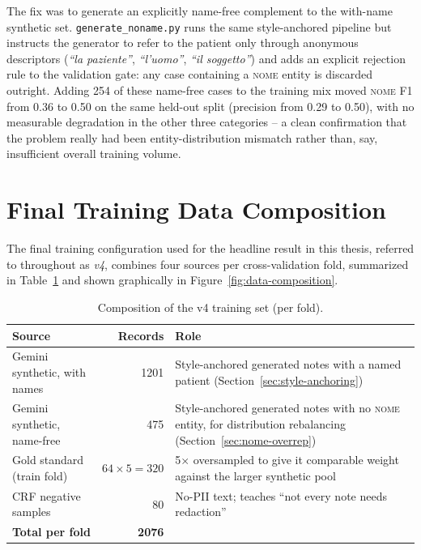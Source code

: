 \documentclass[12pt,a4paper]{report}
\newcommand{\NOME}{\textsc{nome}}
\begin{document}
The fix was to generate an explicitly name-free complement to the with-name synthetic set. \texttt{generate\_noname.py} runs the same style-anchored pipeline but instructs the generator to refer to the patient only through anonymous descriptors (\emph{``la paziente''}, \emph{``l'uomo''}, \emph{``il soggetto''}) and adds an explicit rejection rule to the validation gate: any case containing a \NOME{} entity is discarded outright. Adding 254 of these name-free cases to the training mix moved \NOME{} F1 from 0.36 to 0.50 on the same held-out split (precision from 0.29 to 0.50), with no measurable degradation in the other three categories -- a clean confirmation that the problem really had been entity-distribution mismatch rather than, say, insufficient overall training volume.

\section{Final Training Data Composition}

The final training configuration used for the headline result in this thesis, referred to throughout as \emph{v4}, combines four sources per cross-validation fold, summarized in Table~\ref{tab:data-composition-thesis} and shown graphically in Figure~\ref{fig:data-composition}.

\begin{table}[htbp]
\centering
\caption{Composition of the v4 training set (per fold).}
\label{tab:data-composition-thesis}
\begin{tabular}{p{3.9cm}rp{7.2cm}}
\toprule
Source & Records & Role \\
\midrule
Gemini synthetic, with names & 1201 & Style-anchored generated notes with a named patient (Section~\ref{sec:style-anchoring}) \\
Gemini synthetic, name-free & 475 & Style-anchored generated notes with no \NOME{} entity, for distribution rebalancing (Section~\ref{sec:nome-overrep}) \\
Gold standard (train fold) & $64 \times 5 = 320$ & 5$\times$ oversampled to give it comparable weight against the larger synthetic pool \\
CRF negative samples & 80 & No-PII text; teaches ``not every note needs redaction'' \\
\midrule
\textbf{Total per fold} & \textbf{2076} & \\
\bottomrule
\end{tabular}
\end{table}
\end{document}
